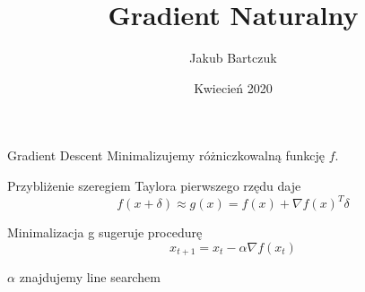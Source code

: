 \documentclass[unknownkeysallowed]{beamer}
\title{Gradient Naturalny}
\subtitle{}
\author{Jakub Bartczuk}
\date{Kwiecień 2020}
\begin{document}
\maketitle

\newcommand{\gradfx}{\nabla f(x)}

\begin{frame}{Gradient Descent}
  Minimalizujemy różniczkowalną funkcję $f$.

  Przybliżenie szeregiem Taylora pierwszego rzędu daje
  $$f(x + \delta) \approx g(x) = f(x) + \gradfx^T \delta $$

  Minimalizacja g sugeruje procedurę 
  $$x_{t+1} = x_t - \alpha \nabla f(x_t)$$

  $\alpha$ znajdujemy line searchem

\end{frame}
\end{document}
